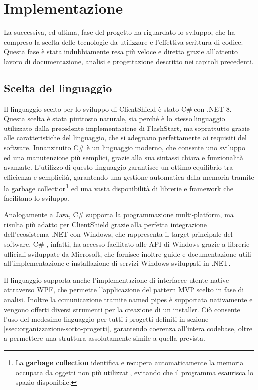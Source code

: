 \documentclass[12pt,a4paper,openright,twoside]{book}
\newcommand{\cs}{C\# }
\begin{document}

\chapter{Implementazione}

La successiva, ed ultima, fase del progetto ha riguardato lo sviluppo, che ha compreso la scelta delle tecnologie da utilizzare e l'effettiva scrittura di codice.
Questa fase è stata indubbiamente resa più veloce e diretta grazie all'attento lavoro di documentazione, analisi e progettazione descritto nei capitoli precedenti.

\section{Scelta del linguaggio}

Il linguaggio scelto per lo sviluppo di ClientShield è stato \cs con .NET 8.
Questa scelta è stata piuttosto naturale, sia perché è lo stesso linguaggio utilizzato dalla precedente implementazione di FlashStart, ma soprattutto grazie alle caratteristiche del linguaggio, che si adeguano perfettamente ai requisiti del software.
Innanzitutto \cs è un linguaggio moderno, che consente uno sviluppo ed una manutenzione più semplici, grazie alla sua sintassi chiara e funzionalità avanzate.
L'utilizzo di questo linguaggio garantisce un ottimo equilibrio tra efficienza e semplicità, garantendo una gestione automatica della memoria tramite la garbage collection\footnote{La \textbf{garbage collection} identifica e recupera automaticamente la memoria occupata da oggetti non più utilizzati, evitando che il programma esaurisca lo spazio disponibile.} ed una vasta disponibilità di librerie e framework che facilitano lo sviluppo.

Analogamente a Java, \cs supporta la programmazione multi-platform, ma risulta più adatto per ClientShield grazie alla perfetta integrazione dell'ecosistema .NET con Windows, che rappresenta il target principale del software.
\cs, infatti, ha accesso facilitato alle API di Windows grazie a librerie ufficiali sviluppate da Microsoft, che fornisce inoltre guide e documentazione utili all'implementazione e installazione di servizi Windows sviluppati in .NET. 

Il linguaggio supporta anche l'implementazione di interfacce utente native attraverso \gls{WPF}, che permette l'applicazione del pattern \gls{MVP} scelto in fase di analisi.
Inoltre la comunicazione tramite named pipes è supportata nativamente e vengono offerti diversi strumenti per la creazione di un installer.
Ciò consente l'uso del medesimo linguaggio per tutti i progetti definiti in sezione \ref{ssec:organizzazione-sotto-progetti}, garantendo coerenza all'intera codebase, oltre a permettere una struttura assolutamente simile a quella prevista.
\end{document}
